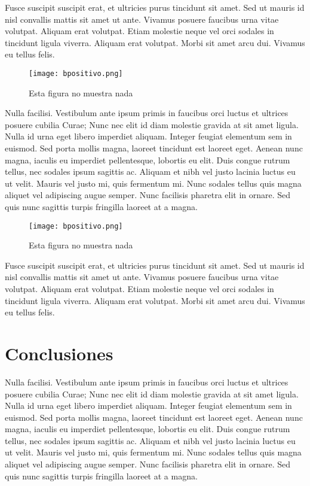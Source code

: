 \documentclass[twocolumn,a4paper,10pt]{article}
\begin{document}
Fusce suscipit suscipit erat, et ultricies purus tincidunt sit amet. Sed ut mauris id nisl convallis mattis sit amet ut ante. Vivamus posuere faucibus urna vitae volutpat. Aliquam erat volutpat. Etiam molestie neque vel orci sodales in tincidunt ligula viverra. Aliquam erat volutpat. Morbi sit amet arcu dui. Vivamus eu tellus felis.

\begin{figure}
    \center \texttt{[image: bpositivo.png]}
    \caption{Esta figura no muestra nada}
\end{figure}

Nulla facilisi. Vestibulum ante ipsum primis in faucibus orci luctus et ultrices posuere cubilia Curae; Nunc nec elit id diam molestie gravida at sit amet ligula. Nulla id urna eget libero imperdiet aliquam. Integer feugiat elementum sem in euismod. Sed porta mollis magna, laoreet tincidunt est laoreet eget. Aenean nunc magna, iaculis eu imperdiet pellentesque, lobortis eu elit. Duis congue rutrum tellus, nec sodales ipsum sagittis ac. Aliquam et nibh vel justo lacinia luctus eu ut velit. Mauris vel justo mi, quis fermentum mi. Nunc sodales tellus quis magna aliquet vel adipiscing augue semper. Nunc facilisis pharetra elit in ornare. Sed quis nunc sagittis turpis fringilla laoreet at a magna.
\begin{figure}
    \center \texttt{[image: bpositivo.png]}
    \caption{Esta figura no muestra nada}
\end{figure}

Fusce suscipit suscipit erat, et ultricies purus tincidunt sit amet. Sed ut mauris id nisl convallis mattis sit amet ut ante. Vivamus posuere faucibus urna vitae volutpat. Aliquam erat volutpat. Etiam molestie neque vel orci sodales in tincidunt ligula viverra. Aliquam erat volutpat. Morbi sit amet arcu dui. Vivamus eu tellus felis.

\section{Conclusiones}
Nulla facilisi. Vestibulum ante ipsum primis in faucibus orci luctus et ultrices posuere cubilia Curae; Nunc nec elit id diam molestie gravida at sit amet ligula. Nulla id urna eget libero imperdiet aliquam. Integer feugiat elementum sem in euismod. Sed porta mollis magna, laoreet tincidunt est laoreet eget. Aenean nunc magna, iaculis eu imperdiet pellentesque, lobortis eu elit. Duis congue rutrum tellus, nec sodales ipsum sagittis ac. Aliquam et nibh vel justo lacinia luctus eu ut velit. Mauris vel justo mi, quis fermentum mi. Nunc sodales tellus quis magna aliquet vel adipiscing augue semper. Nunc facilisis pharetra elit in ornare. Sed quis nunc sagittis turpis fringilla laoreet at a magna.
\end{document}
